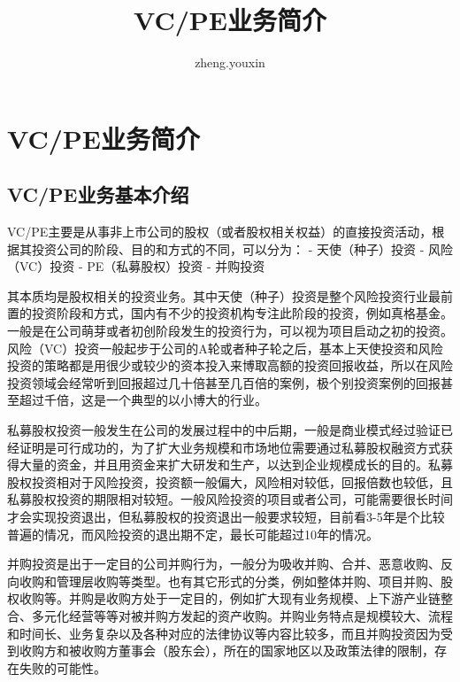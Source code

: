 \documentclass[
]{article}
\title{VC/PE业务简介}
\author{zheng.youxin}
\date{}
\begin{document}
\maketitle
\ifdefined\Shaded\renewenvironment{Shaded}{\begin{tcolorbox}[frame hidden, enhanced, boxrule=0pt, breakable, sharp corners, borderline west={3pt}{0pt}{shadecolor}, interior hidden]}{\end{tcolorbox}}\fi

\hypertarget{vcpeux4e1aux52a1ux7b80ux4ecb}{%
\section{VC/PE业务简介}\label{vcpeux4e1aux52a1ux7b80ux4ecb}}

\hypertarget{vcpeux4e1aux52a1ux57faux672cux4ecbux7ecd}{%
\subsection{VC/PE业务基本介绍}\label{vcpeux4e1aux52a1ux57faux672cux4ecbux7ecd}}

VC/PE主要是从事非上市公司的股权（或者股权相关权益）的直接投资活动，根据其投资公司的阶段、目的和方式的不同，可以分为：
- 天使（种子）投资 - 风险（VC）投资 - PE（私募股权）投资 - 并购投资

其本质均是股权相关的投资业务。其中天使（种子）投资是整个风险投资行业最前置的投资阶段和方式，国内有不少的投资机构专注此阶段的投资，例如真格基金。一般是在公司萌芽或者初创阶段发生的投资行为，可以视为项目启动之初的投资。风险（VC）投资一般起步于公司的A轮或者种子轮之后，基本上天使投资和风险投资的策略都是用很少或较少的资本投入来博取高额的投资回报收益，所以在风险投资领域会经常听到回报超过几十倍甚至几百倍的案例，极个别投资案例的回报甚至超过千倍，这是一个典型的以小博大的行业。

私募股权投资一般发生在公司的发展过程中的中后期，一般是商业模式经过验证已经证明是可行成功的，为了扩大业务规模和市场地位需要通过私募股权融资方式获得大量的资金，并且用资金来扩大研发和生产，以达到企业规模成长的目的。私募股权投资相对于风险投资，投资额一般偏大，风险相对较低，回报倍数也较低，且私募股权投资的期限相对较短。一般风险投资的项目或者公司，可能需要很长时间才会实现投资退出，但私募股权的投资退出一般要求较短，目前看3-5年是个比较普遍的情况，而风险投资的退出期不定，最长可能超过10年的情况。

并购投资是出于一定目的公司并购行为，一般分为吸收并购、合并、恶意收购、反向收购和管理层收购等类型。也有其它形式的分类，例如整体并购、项目并购、股权收购等。并购是收购方处于一定目的，例如扩大现有业务规模、上下游产业链整合、多元化经营等等对被并购方发起的资产收购。并购业务特点是规模较大、流程和时间长、业务复杂以及各种对应的法律协议等内容比较多，而且并购投资因为受到收购方和被收购方董事会（股东会），所在的国家地区以及政策法律的限制，存在失败的可能性。
\end{document}
